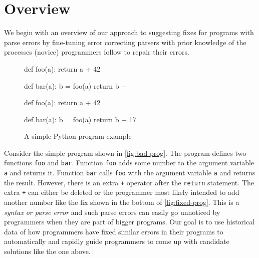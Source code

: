 \section{Overview}
\label{sec:overview}

We begin with an overview of our approach to suggesting fixes for programs with
parse errors by fine-tuning error correcting parsers with prior knowledge of the
processes (novice) programmers follow to repair their errors.

\begin{figure}[h]
\centering
\begin{minipage}[c]{0.48\linewidth}
\begin{ecode}
def foo(a):
  return a + 42

def bar(a):
  b = foo(a)
  return b +
\end{ecode}
\label{fig:bad-prog}
\end{minipage}%
\hspace{0.02\linewidth}%
\begin{minipage}[c]{0.48\linewidth}
\begin{ecode}
def foo(a):
  return a + 42

def bar(a):
  b = foo(a)
  return b + 17
\end{ecode}
\label{fig:fixed-prog}
\end{minipage}
\caption{A simple Python program example}
\end{figure}


 Consider the simple program shown in
\autoref{fig:bad-prog}. The program defines two functions \texttt{foo} and
\texttt{bar}. Function \texttt{foo} adds some number to the argument variable
\texttt{a} and returns it. Function \texttt{bar} calls \texttt{foo} with the
argument variable \texttt{a} and returns the result. However, there is an extra
\texttt{+} operator after the \texttt{return} statement. The extra \texttt{+}
can either be deleted or the programmer most likely intended to add another
number like the fix shown in the bottom of \autoref{fig:fixed-prog}. This is a
\emph{syntax or parse error} and such parse errors can easily go unnoticed
\citep{Denny_2012, Ahadi_2018, VanDerSpek_2005} by programmers when they are
part of bigger programs. Our goal is to use historical data of how programmers
have fixed similar errors in their programs to automatically and rapidly guide
programmers to come up with candidate solutions like the one above.


